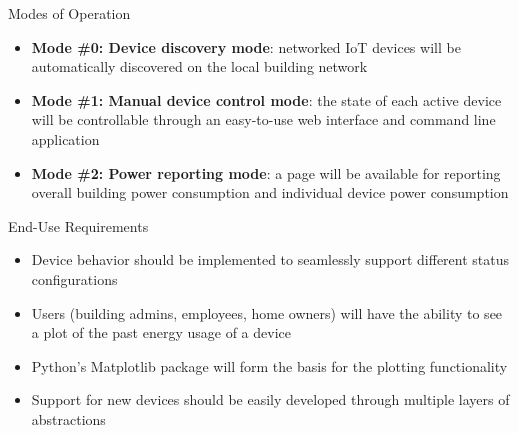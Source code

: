 \documentclass{beamer}
\begin{document}
\begin{frame}{Modes of Operation}{}
    \begin{itemize}
        \item \textbf{Mode \#0: Device discovery mode}: networked IoT devices will be automatically discovered on the local building network
        \item \textbf{Mode \#1: Manual device control mode}: the state of each active device will be controllable through an easy-to-use web interface and command line application
        \item \textbf{Mode \#2: Power reporting mode}: a page will be available for reporting overall building power consumption and individual device power consumption
    \end{itemize}
\end{frame}

\begin{frame}{End-Use Requirements}{}
    \begin{itemize}
        \item Device behavior should be implemented to seamlessly support different status configurations
        \item Users (building admins, employees, home owners) will have the ability to see a plot of the past energy usage of a device 
        \item Python's Matplotlib package will form the basis for the plotting functionality 
        \item Support for new devices should be easily developed through multiple layers of abstractions
    \end{itemize}    
\end{frame}

\end{document}
